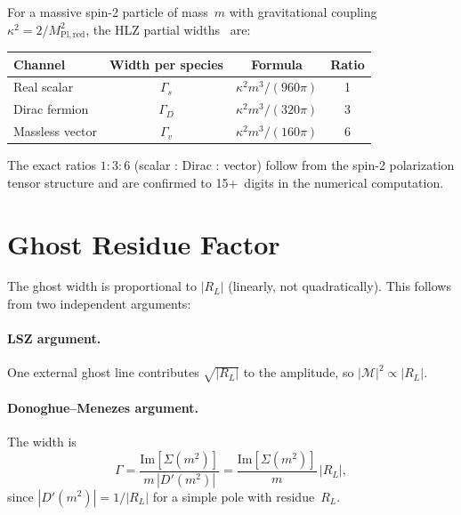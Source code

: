 \documentclass[11pt,a4paper]{article}
\newcommand{\MPlred}{M_{\mathrm{Pl,red}}}
\newcommand{\Imag}{\mathrm{Im}}
\begin{document}
For a massive spin-2 particle of mass~$m$ with gravitational coupling
$\kappa^2 = 2/\MPlred^2$, the HLZ partial widths~\cite{HLZ1999} are:

\begin{center}
\begin{tabular}{lccc}
\toprule
Channel & Width per species & Formula & Ratio \\
\midrule
Real scalar & $\Gamma_s$ & $\kappa^2 m^3 / (960\pi)$ & 1 \\
Dirac fermion & $\Gamma_D$ & $\kappa^2 m^3 / (320\pi)$ & 3 \\
Massless vector & $\Gamma_v$ & $\kappa^2 m^3 / (160\pi)$ & 6 \\
\bottomrule
\end{tabular}
\end{center}

\noindent
The exact ratios $1:3:6$ (scalar : Dirac : vector) follow from the
spin-2 polarization tensor structure and are confirmed to 15+~digits
in the numerical computation.


\section{Ghost Residue Factor}
\label{sec:residue}

The ghost width is proportional to $|R_L|$ (linearly, not quadratically).
This follows from two independent arguments:

\paragraph{LSZ argument.}
One external ghost line contributes $\sqrt{|R_L|}$ to the amplitude,
so $|\mathcal{M}|^2 \propto |R_L|$.

\paragraph{Donoghue--Menezes argument.}
The width is~\cite{DM2019}
\begin{equation}
  \Gamma
  = \frac{\Imag[\Sigma(m^2)]}{m\,|D'(m^2)|}
  = \frac{\Imag[\Sigma(m^2)]}{m}\,|R_L|,
\end{equation}
since $|D'(m^2)| = 1/|R_L|$ for a simple pole with residue~$R_L$.


\end{document}
